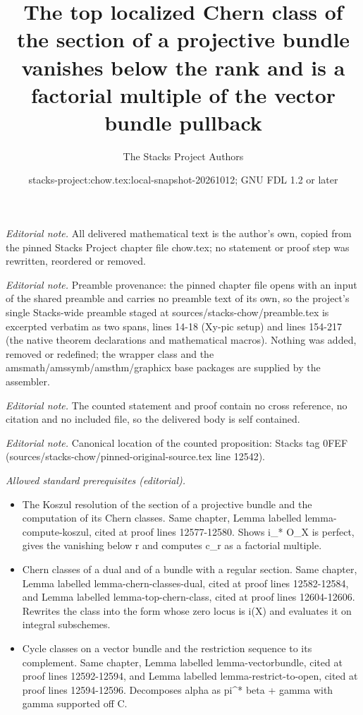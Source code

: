 \documentclass[10pt,a4paper]{amsart}
\title{The top localized Chern class of the section of a projective bundle vanishes below the rank and is a factorial multiple of the vector bundle pullback}
\author{The Stacks Project Authors}
\date{stacks-project:chow.tex:local-snapshot-20261012; GNU FDL 1.2 or later}
\theoremstyle{plain}
\theoremstyle{definition}
\theoremstyle{remark}
\numberwithin{equation}{subsection}
\begin{document}
\maketitle
\noindent\textit{Editorial note.} All delivered mathematical text is the author's own, copied from the pinned Stacks Project chapter file chow.tex; no statement or proof step was rewritten, reordered or removed.\par\medskip
\noindent\textit{Editorial note.} Preamble provenance: the pinned chapter file opens with an input of the shared preamble and carries no preamble text of its own, so the project's single Stacks-wide preamble staged at sources/stacks-chow/preamble.tex is excerpted verbatim as two spans, lines 14-18 (Xy-pic setup) and lines 154-217 (the native theorem declarations and mathematical macros). Nothing was added, removed or redefined; the wrapper class and the amsmath/amssymb/amsthm/graphicx base packages are supplied by the assembler.\par\medskip
\noindent\textit{Editorial note.} The counted statement and proof contain no cross reference, no citation and no included file, so the delivered body is self contained.\par\medskip
\noindent\textit{Editorial note.} Canonical location of the counted proposition: Stacks tag 0FEF (sources/stacks-chow/pinned-original-source.tex line 12542).\par\medskip
\noindent\textit{Allowed standard prerequisites (editorial).}\begin{itemize}
\item The Koszul resolution of the section of a projective bundle and the computation of its Chern classes. Same chapter, Lemma labelled lemma-compute-koszul, cited at proof lines 12577-12580. Shows i\_* O\_X is perfect, gives the vanishing below r and computes c\_r as a factorial multiple.
\item Chern classes of a dual and of a bundle with a regular section. Same chapter, Lemma labelled lemma-chern-classes-dual, cited at proof lines 12582-12584, and Lemma labelled lemma-top-chern-class, cited at proof lines 12604-12606. Rewrites the class into the form whose zero locus is i(X) and evaluates it on integral subschemes.
\item Cycle classes on a vector bundle and the restriction sequence to its complement. Same chapter, Lemma labelled lemma-vectorbundle, cited at proof lines 12592-12594, and Lemma labelled lemma-restrict-to-open, cited at proof lines 12594-12596. Decomposes alpha as pi\textasciicircum{}* beta + gamma with gamma supported off C.
\end{itemize}\medskip
\end{document}
